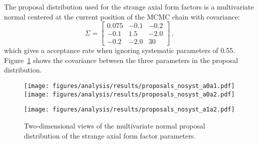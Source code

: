     The proposal distribution used for the strange axial form factors is a
    multivariate normal centered at the current position of the MCMC chain with
    covariance:
    \begin{equation}\label{eq:axproposal}
      \Sigma = 
      \begin{bmatrix}
        0.075 & -0.1 & -0.2 \\
        -0.1  &  1.5 & -2.0 \\
        -0.2  & -2.0 &  30  
      \end{bmatrix} \,,
    \end{equation}
    which gives a acceptance rate when ignoring systematic parameters of 0.55.
    Figure~\ref{fig:gasproposals} shows the covariance between the three
    parameters in the proposal distribution.
    \begin{figure}[h]
      \texttt{[image: figures/analysis/results/proposals\_nosyst\_a0a1.pdf]}
      \hspace{2pt}
      \texttt{[image: figures/analysis/results/proposals\_nosyst\_a0a2.pdf]}
      \begin{flushright}
      \texttt{[image: figures/analysis/results/proposals\_nosyst\_a1a2.pdf]}
      \end{flushright} 
      \caption{Two-dimensional views of the multivariate normal proposal
      distribution of the strange axial form factor parameters.}
      \label{fig:gasproposals}
    \end{figure}

